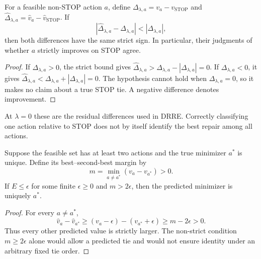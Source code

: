 \begin{proposition}
\label{prop:stop-sign-stability}
For a feasible non-STOP action $a$, define
$\Delta_{\lambda,a}=v_a-v_{\operatorname{STOP}}$ and
$\widehat\Delta_{\lambda,a}=\widehat v_a-\widehat v_{\operatorname{STOP}}$.
If
\[
 |\widehat\Delta_{\lambda,a}-\Delta_{\lambda,a}|
 <|\Delta_{\lambda,a}|,
\]
then both differences have the same strict sign. In particular, their
judgments of whether $a$ strictly improves on STOP agree.
\end{proposition}
\begin{proof}
If $\Delta_{\lambda,a}>0$, the strict bound gives
$\widehat\Delta_{\lambda,a}>
\Delta_{\lambda,a}-|\Delta_{\lambda,a}|=0$.
If $\Delta_{\lambda,a}<0$, it gives
$\widehat\Delta_{\lambda,a}<
\Delta_{\lambda,a}+|\Delta_{\lambda,a}|=0$.
The hypothesis cannot hold when $\Delta_{\lambda,a}=0$, so it makes no
claim about a true STOP tie. A negative difference denotes improvement.
\end{proof}
At $\lambda=0$ these are the residual differences used in DRRE. Correctly
classifying one action relative to STOP does not by itself identify the
best repair among all actions.

\begin{proposition}
\label{prop:action-identity}
Suppose the feasible set has at least two actions and the true minimizer
$a^*$ is unique. Define its best--second-best margin by
\[
 m=\min_{a\ne a^*}(v_a-v_{a^*})>0.
\]
If $E\leq\epsilon$ for some finite $\epsilon\geq0$ and $m>2\epsilon$,
then the predicted minimizer is uniquely $a^*$.
\end{proposition}
\begin{proof}
For every $a\ne a^*$,
\[
 \widehat v_a-\widehat v_{a^*}
 \geq (v_a-\epsilon)-(v_{a^*}+\epsilon)
 \geq m-2\epsilon>0.
\]
Thus every other predicted value is strictly larger. The non-strict
condition $m\geq2\epsilon$ alone would allow a predicted tie and would not
ensure identity under an arbitrary fixed tie order.
\end{proof}

